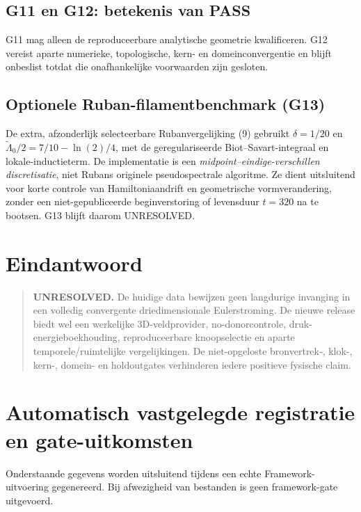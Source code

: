 \documentclass[10pt,a4paper]{article}
\begin{document}
\subsection{G11 en G12: betekenis van PASS}
G11 mag alleen de reproduceerbare analytische geometrie kwalificeren.
G12 vereist aparte numerieke, topologische, kern- en domeinconvergentie en blijft
onbeslist totdat die onafhankelijke voorwaarden zijn gesloten.
\subsection{Optionele Ruban-filamentbenchmark (G13)}
De extra, afzonderlijk selecteerbare Rubanvergelijking (9) gebruikt
$\delta=1/20$ en $\widetilde\Lambda_0/2=7/10-\ln(2)/4$,
met de geregulariseerde Biot--Savart-integraal en lokale-inductieterm.
De implementatie is een \emph{midpoint--eindige-verschillen discretisatie},
niet Rubans originele pseudospectrale algoritme. Ze dient uitsluitend voor
korte controle van Hamiltoniaandrift en geometrische vormverandering,
zonder een niet-gepubliceerde beginverstoring of levensduur $t=320$ na te bootsen.
G13 blijft daarom UNRESOLVED.
\section{Eindantwoord}
\begin{quote}\textbf{UNRESOLVED.} De huidige data bewijzen geen langdurige invanging in een volledig convergente driedimensionale Eulerstroming. De nieuwe release biedt wel een werkelijke 3D-veldprovider, no-donorcontrole, druk-energieboekhouding, reproduceerbare knoopselectie en aparte temporele/ruimtelijke vergelijkingen. De niet-opgeloste bronvertrek-, klok-, kern-, domein- en holdoutgates verhinderen iedere positieve fysische claim.\end{quote}
\section{Automatisch vastgelegde registratie en gate-uitkomsten}
Onderstaande gegevens worden uitsluitend tijdens een echte Framework-uitvoering gegenereerd.
Bij afwezigheid van bestanden is geen framework-gate uitgevoerd.
\end{document}
